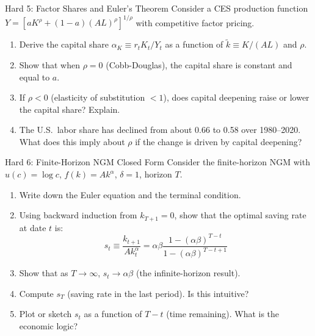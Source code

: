 \documentclass[aspectratio=169,10pt]{beamer}
\newcommand{\apxbutton}[1]{\hfill\hyperlink{#1}{\beamerbutton{Solution}}}
\begin{document}
\begin{frame}{Hard 5: Factor Shares and Euler's Theorem}
\hypertarget{q-h5}{}
Consider a CES production function $Y = [aK^\rho + (1-a)(AL)^\rho]^{1/\rho}$ with competitive factor pricing.

\begin{enumerate}
  \item Derive the capital share $\alpha_K \equiv r_t K_t / Y_t$ as a function of $\tilde{k} \equiv K/(AL)$ and $\rho$.
  \item Show that when $\rho = 0$ (Cobb-Douglas), the capital share is constant and equal to $a$.
  \item If $\rho < 0$ (elasticity of substitution $<1$), does capital deepening raise or lower the capital share? Explain.
  \item The U.S.\ labor share has declined from about 0.66 to 0.58 over 1980--2020. What does this imply about $\rho$ if the change is driven by capital deepening?
\end{enumerate}
\apxbutton{s-h5}
\end{frame}

\begin{frame}{Hard 6: Finite-Horizon NGM Closed Form}
\hypertarget{q-h6}{}
Consider the finite-horizon NGM with $u(c)=\log c$, $f(k)=Ak^\alpha$, $\delta=1$, horizon $T$.

\begin{enumerate}
  \item Write down the Euler equation and the terminal condition.
  \item Using backward induction from $k_{T+1}=0$, show that the optimal saving rate at date $t$ is:
  \[
  s_t \equiv \frac{k_{t+1}}{Ak_t^\alpha} = \alpha\beta\frac{1-(\alpha\beta)^{T-t}}{1-(\alpha\beta)^{T-t+1}}
  \]
  \item Show that as $T \to \infty$, $s_t \to \alpha\beta$ (the infinite-horizon result).
  \item Compute $s_T$ (saving rate in the last period). Is this intuitive?
  \item Plot or sketch $s_t$ as a function of $T-t$ (time remaining). What is the economic logic?
\end{enumerate}
\apxbutton{s-h6}
\end{frame}

\end{document}
